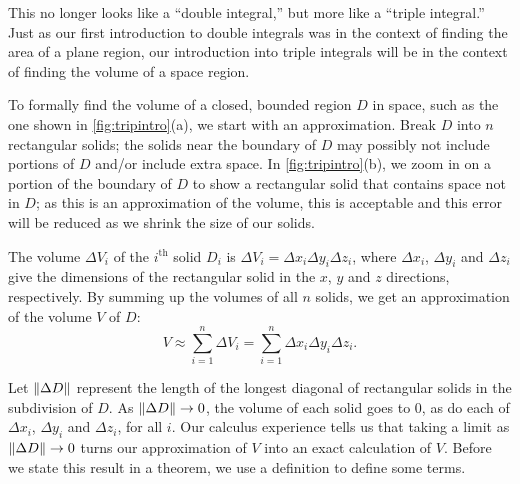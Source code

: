 This no longer looks like a ``double integral,'' but more like a ``triple integral.'' Just as our first introduction to double integrals was in the context of finding the area of a plane region, our introduction into triple integrals will be in the context of finding the volume of a space region.


To formally find the volume of a closed, bounded region $D$ in space, such as the one shown in \autoref{fig:tripintro}(a), we start with an approximation. Break $D$ into $n$ rectangular solids; the solids near the boundary of $D$ may possibly not include portions of $D$ and/or include extra space. In \autoref{fig:tripintro}(b), we zoom in on a portion of the boundary of $D$ to show a rectangular solid that contains space not in $D$; as this is an approximation of the volume, this is acceptable and this error will be reduced as we shrink the size of our solids.

The volume $\Delta V_i$ of the $i^{\text{th}}$ solid $D_i$ is $\Delta V_i = \Delta x_i\Delta y_i\Delta z_i$, where $\Delta x_i$, $\Delta y_i$ and $\Delta z_i$ give the dimensions of the rectangular solid in the $x$, $y$ and $z$ directions, respectively. By summing up the volumes of all $n$ solids, we get an approximation of the volume $V$ of $D$:
\[V \approx \sum_{i=1}^n \Delta V_i = \sum_{i=1}^n \Delta x_i\Delta y_i\Delta z_i.\]

Let $\left\lVert \Delta D \right\rVert$ represent the length of the longest diagonal of rectangular solids in the subdivision of $D$. As $\left\lVert \Delta D \right\rVert\to 0$, the volume of each solid goes to 0, as do each of $\Delta x_i$, $\Delta y_i$ and $\Delta z_i$, for all $i$. Our calculus experience tells us that taking a limit as $\left\lVert \Delta D \right\rVert\to 0$ turns our approximation of $V$ into an exact calculation of $V$. Before we state this result in a theorem, we use a definition to define some terms.

